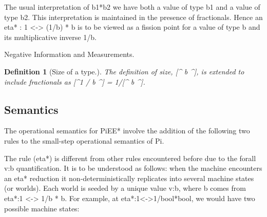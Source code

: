 \documentclass[preprint]{sigplanconf}
\newtheorem{definition}[theorem]{Definition}
\begin{document}
The usual interpretation of {{b1*b2}} we have both a value of type
{{b1}} and a value of type {{b2}}. This interpretation is maintained
in the presence of fractionals. Hence an {{eta* : 1 <-> (1/b) * b}} is
to be viewed as a fission point for a value of type {{b}} and its
multiplicative inverse {{1/b}}. 

\begin{multicols}{2}
\begin{center}
\end{center}

\begin{center}
\end{center}  
\end{multicols}

Negative Information and Measurements. 

\begin{definition}[Size of a type.] 
\label{def:size-frac}
The definition of size, {{[^ b ^]}}, is extended to include
fractionals as {{[^1 / b ^] = 1/[^ b ^]}}.
\end{definition}

\subsection{Semantics}

The operational semantics for {{PiEE*}} involve the addition of the
following two rules to the small-step operational semantics of {{Pi}}.


The rule {{(eta*)}} is different from other rules encountered before
due to the {{forall v:b}} quantification. It is to be understood as
follows: when the machine encounters an {{eta*}} reduction it
non-deterministically replicates into several machine states (or
worlds). Each world is seeded by a unique value {{v:b}}, where {{b}}
comes from {{eta*:1 <-> 1/b * b}}.  For example, at
{{eta*:1<->1/bool*bool}}, we would have two possible machine
states:
\end{document}
